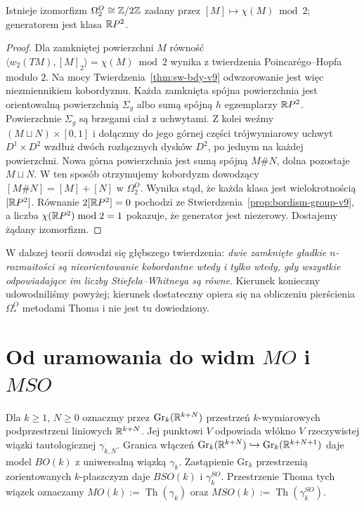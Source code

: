 \begin{twierdzenie}
\label{thm:omega2-v9}
Istnieje izomorfizm
$\Omega_2^O\cong\mathbb{Z}/2\mathbb{Z}$ zadany przez
$[M]\mapsto\chi(M)\bmod2$; generatorem jest
klasa $\mathbb{R} P^2$.
\end{twierdzenie}
\begin{proof}
Dla zamkniętej powierzchni $M$ równość
$\langle w_2(TM),[M]_2\rangle=\chi(M)\bmod2$
wynika z twierdzenia Poincarégo--Hopfa modulo $2$.
Na mocy Twierdzenia~\ref{thm:sw-bdy-v9} odwzorowanie
jest więc niezmiennikiem kobordyzmu.
Każda zamknięta spójna powierzchnia jest orientowalną
powierzchnią $\Sigma_g$ albo sumą spójną $h$ egzemplarzy
$\mathbb{R} P^2$. Powierzchnie $\Sigma_g$ są brzegami ciał
z uchwytami. Z kolei weźmy
$(M\sqcup N)\times[0,1]$ i dołączmy do jego górnej
części trójwymiarowy uchwyt $D^1\times D^2$
wzdłuż dwóch rozłącznych dysków $D^2$,
po jednym na każdej powierzchni. Nowa górna
powierzchnia jest sumą spójną $M\#N$,
dolna pozostaje $M\sqcup N$. W ten sposób
otrzymujemy kobordyzm dowodzący
$[M\#N]=[M]+[N]$ w $\Omega_2^O$.
Wynika stąd, że każda klasa jest wielokrotnością
$[\mathbb{R} P^2]$. Równanie $2[\mathbb{R} P^2]=0$ pochodzi
ze Stwierdzenia~\ref{prop:bordism-group-v9}, a liczba
$\chi(\mathbb{R} P^2)\bmod2=1$ pokazuje, że generator
jest niezerowy. Dostajemy żądany izomorfizm.
\end{proof}

\begin{uwaga}
W dalszej teorii dowodzi się głębszego twierdzenia:
\emph{dwie zamknięte gładkie $n$-rozmaitości są
nieorientowanie kobordantne wtedy i tylko wtedy, gdy
wszystkie odpowiadające im liczby Stiefela--Whitneya
są równe}. Kierunek konieczny udowodniliśmy powyżej;
kierunek dostateczny opiera się na obliczeniu pierścienia
$\Omega_*^O$ metodami Thoma i nie jest tu dowiedziony.
\end{uwaga}

\section{Od uramowania do widm \texorpdfstring{$MO$ i $MSO$}{MO i MSO}}
\begin{definicja}
Dla $k\ge1$, $N\ge0$ oznaczmy przez
$\mathrm{Gr}_k(\mathbb{R}^{k+N})$ przestrzeń $k$-wymiarowych
podprzestrzeni liniowych $\mathbb{R}^{k+N}$. Jej punktowi $V$
odpowiada włókno $V$ rzeczywistej wiązki tautologicznej
$\gamma_{k,N}$. Granica włączeń
$\mathrm{Gr}_k(\mathbb{R}^{k+N})\hookrightarrow
\mathrm{Gr}_k(\mathbb{R}^{k+N+1})$ daje model $BO(k)$
z uniwersalną wiązką $\gamma_k$. Zastąpienie
$\mathrm{Gr}_k$ przestrzenią zorientowanych
$k$-płaszczyzn daje $BSO(k)$ i $\gamma_k^{SO}$.
Przestrzenie Thoma tych wiązek oznaczamy
$MO(k):=\operatorname{Th}(\gamma_k)$ oraz
$MSO(k):=\operatorname{Th}(\gamma_k^{SO})$.
\end{definicja}

